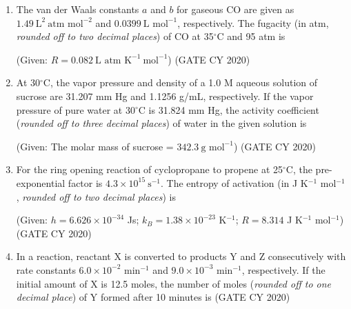\documentclass[12pt]{article}
\begin{document}
\begin{enumerate}
\item The van der Waals constants $a$ and $b$ for gaseous CO are given as $1.49~\text{L}^2~\text{atm mol}^{-2}$ and $0.0399~\text{L mol}^{-1}$, respectively. The fugacity (in atm, \textit{rounded off to two decimal places}) of CO at 35$^\circ$C and 95 atm is \underline{\hspace{2cm}}

(Given: $R = 0.082~\text{L atm K}^{-1}~\text{mol}^{-1}$)
\hfill (GATE CY 2020)

\item At 30$^\circ$C, the vapor pressure and density of a 1.0 M aqueous solution of sucrose are 31.207 mm Hg and 1.1256 g/mL, respectively. If the vapor pressure of pure water at 30$^\circ$C is 31.824 mm Hg, the activity coefficient (\textit{rounded off to three decimal places}) of water in the given solution is \underline{\hspace{2cm}}

(Given: The molar mass of sucrose = $342.3~\text{g mol}^{-1}$)
\hfill (GATE CY 2020)

\item For the ring opening reaction of cyclopropane to propene at 25$^\circ$C, the pre-exponential factor is $4.3 \times 10^{15}~\text{s}^{-1}$. The entropy of activation (in J K$^{-1}$ mol$^{-1}$, \textit{rounded off to two decimal places}) is \underline{\hspace{2cm}}

(Given: $h = 6.626 \times 10^{-34}$ Js; $k_B = 1.38 \times 10^{-23}$ K$^{-1}$; $R = 8.314$ J K$^{-1}$ mol$^{-1}$)
\hfill (GATE CY 2020)

\item In a reaction, reactant X is converted to products Y and Z consecutively with rate constants $6.0 \times 10^{-2}$ min$^{-1}$ and $9.0 \times 10^{-3}$ min$^{-1}$, respectively. If the initial amount of X is 12.5 moles, the number of moles (\textit{rounded off to one decimal place}) of Y formed after 10 minutes is \underline{\hspace{2cm}}
\hfill (GATE CY 2020)



\end{enumerate}
\end{document}

